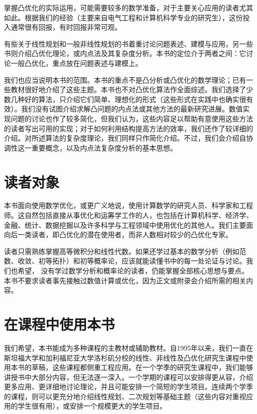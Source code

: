 掌握凸优化的实际运用，可能需要较多的数学准备，对于主要关心应用的读者尤其如此。根据我们的经验（主要来自电气工程和计算机科学专业的研究生），这份投入通常很有回报，有时回报非常可观。

有些关于线性规划和一般非线性规划的书着重讨论问题表述、建模与应用，另一些书则介绍凸优化理论，或内点法及其复杂度分析。本书的定位介于两者之间：它讨论一般凸优化，重点放在问题表述与建模上。

我们也应当说明本书的范围。本书的重点不是凸分析或凸优化的数学理论；已有一些教材很好地介绍了这些主题。本书也不对凸优化算法作全面综述。我们选择了少数几种好的算法，只介绍它们简单、理想化的形式（这些形式在实践中也确实很有效）。我们没有试图介绍求解凸问题的内点法或其他方法的最新研究进展。数值实现问题的讨论也作了较多简化，但我们认为，这些内容足以帮助有意使用这些方法的读者写出可用的实现；对于如何利用结构提高方法的效率，我们还作了较详细的介绍。对所述算法的复杂度理论，我们同样只作简化介绍。不过，我们会介绍自协调性这一重要概念，以及内点法复杂度分析的基本思想。

\section*{读者对象}
本书面向使用数学优化，或更广义地说，使用计算数学的研究人员、科学家和工程师。这自然包括直接从事优化和运筹学工作的人，也包括在计算机科学、经济学、金融、统计、数据挖掘以及许多科学与工程领域中使用优化的其他人。我们主要面向后一类读者，即凸优化的潜在使用者，而非人数相对较少的凸优化专家。

读者只需熟练掌握高等微积分和线性代数。如果还学过基本的数学分析（例如范数、收敛、初等拓扑）和初等概率论，应该就能读懂书中的每一处论证与讨论。我们也希望，
没有学过数学分析和概率论的读者，仍能掌握全部核心思想与要点。本书不要求读者事先接触过数值计算或优化，因为正文或附录会介绍所需的相关内容。

\section*{在课程中使用本书}
我们希望，本书能成为多种课程的主教材或辅助教材。自1995年以来，我们一直在斯坦福大学和加利福尼亚大学洛杉矶分校的线性、非线性及凸优化研究生课程中使用本书的草稿，这些课程都侧重工程应用。在一个学季的研究生课程中，我们能够讲授书中大部分内容，但无法逐一深入。一个学期的课程可以安排得更从容，介绍更多应用、更详细地讨论理论，并且可能安排一个简短的学生项目。连续两个学季的课程，则可以更充分地介绍线性规划、二次规划等基础主题（这些内容对重视应用的学生很有用），或安排一个规模更大的学生项目。

